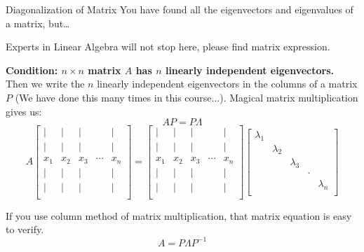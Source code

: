 \documentclass{beamer}
\begin{document}
\begin{frame}{Diagonalization of Matrix}
You have found all the eigenvectors and eigenvalues of a matrix, but\dots

\vspace{3pt}
Experts in Linear Algebra will not stop here, please find matrix expression.

\vspace{3pt}
\textbf{Condition: $n\times n$ matrix $A$ has $n$ linearly independent eigenvectors.} Then we write the $n$ linearly independent eigenvectors in the columns of a matrix $P$ (We have done this many times in this course...). Magical matrix multiplication gives us:
\begin{equation*}
    AP=P\varLambda
\end{equation*}
\begin{equation*}
    A\left[ \begin{matrix}
        |&		|&		|&		&		|\\
        |&		|&		|&		&		|\\
        x_1&		x_2&		x_3&		\cdots&		x_n\\
        |&		|&		|&		&		|\\
        |&		|&		|&		&		|\\
    \end{matrix} \right] =\left[ \begin{matrix}
        |&		|&		|&		&		|\\
        |&		|&		|&		&		|\\
        x_1&		x_2&		x_3&		\cdots&		x_n\\
        |&		|&		|&		&		|\\
        |&		|&		|&		&		|\\
    \end{matrix} \right] \left[ \begin{matrix}
        \lambda _1&		&		&		&		\\
        &		\lambda _2&		&		&		\\
        &		&		\lambda _3&		&		\\
        &		&		&		\cdot&		\\
        &		&		&		&		\lambda _n\\
    \end{matrix} \right]
\end{equation*}

If you use column method of matrix multiplication, that matrix equation is easy to verify.
\begin{equation*}
    A=P\varLambda P^{-1}
\end{equation*}
\end{frame}
\end{document}

